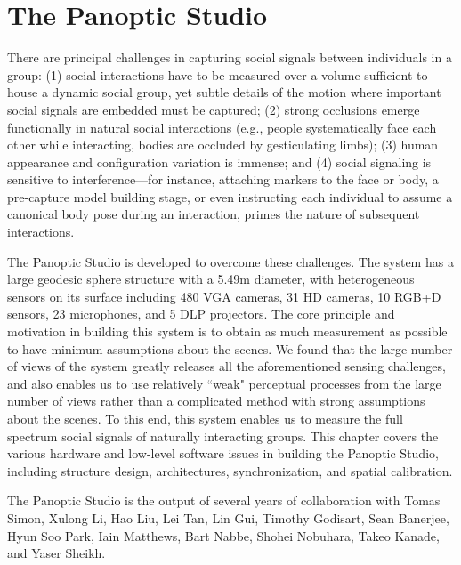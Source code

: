 \chapter{The Panoptic Studio}%
\label{chapter:system}

There are principal challenges in capturing social signals between individuals in a group: (1) social interactions have to be measured over a volume sufficient to house a dynamic social group, yet subtle details of the motion where important social signals are embedded must be captured; (2) strong occlusions emerge functionally in natural social interactions (e.g., people systematically face each other while interacting, bodies are occluded by gesticulating limbs); (3) human appearance and configuration variation is immense; and (4) social signaling is sensitive to interference---for instance, attaching markers to the face or body, a pre-capture model building stage, or even instructing each individual to assume a canonical body pose during an interaction, primes the nature of subsequent interactions. 

The Panoptic Studio is developed to overcome these challenges. The system has a large geodesic sphere structure with a 5.49m diameter, with heterogeneous sensors on its surface including 480 VGA cameras, 31 HD cameras, 10 RGB+D sensors, 23 microphones, and 5 DLP projectors. The core principle and motivation in building this system is to obtain as much measurement as possible to have minimum assumptions about the scenes. We found that the large number of views of the system greatly releases all the aforementioned sensing challenges, and also enables us to use relatively ``weak" perceptual processes from the large number of views rather than a complicated method with strong assumptions about the scenes. To this end, this system enables us to measure the full spectrum social signals of naturally interacting groups. This chapter covers the various hardware and low-level software issues in building the Panoptic Studio, including structure design, architectures, synchronization, and spatial calibration.  

The Panoptic Studio is the output of several years of collaboration with Tomas Simon, Xulong Li, Hao Liu, Lei Tan, Lin Gui, Timothy Godisart, Sean Banerjee, Hyun Soo Park, Iain Matthews, Bart Nabbe, Shohei Nobuhara, Takeo Kanade, and Yaser Sheikh. 

